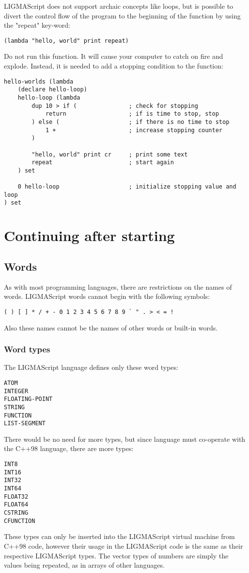 \documentclass[12pt]{article}
\begin{document}
LIGMAScript does not support archaic concepts like loops, but is possible to divert the control flow of 
the program to the beginning of the function by using the "repeat" key-word:
\begin{verbatim}(lambda "hello, world" print repeat)\end{verbatim}
Do not run this function. It will cause your computer to catch on fire and explode. Instead, it is needed to add a stopping condition 
to the function:
\pagebreak
\begin{Verbatim}
hello-worlds (lambda 
    (declare hello-loop)
    hello-loop (lambda
        dup 10 > if (               ; check for stopping
            return                  ; if is time to stop, stop
        ) else (                    ; if there is no time to stop
            1 +                     ; increase stopping counter
        )

        "hello, world" print cr     ; print some text
        repeat                      ; start again
    ) set

    0 hello-loop                    ; initialize stopping value and loop
) set
\end{Verbatim}

\section{Continuing after starting}

\subsection{Words}

As with most programming languages, there are restrictions on the names of words. LIGMA\-Script words cannot begin 
with the following symbols:
\begin{verbatim}( ) [ ] * / + - 0 1 2 3 4 5 6 7 8 9 ` " . > < = ! \end{verbatim}
Also these names cannot be the names of other words or built-in words.

\subsubsection{Word types}

The LIGMAScript language defines only these word types:
\begin{verbatim}
ATOM
INTEGER
FLOATING-POINT
STRING
FUNCTION
LIST-SEGMENT
\end{verbatim}
There would be no need for more types, but since language must co-operate with the C++98 language, there 
are more types:
\begin{verbatim}
INT8
INT16
INT32
INT64
FLOAT32
FLOAT64
CSTRING
CFUNCTION
\end{verbatim}
These types can only be inserted into the LIGMAScript virtual machine from C++98 code, however their usage 
in the LIGMAScript code is the same as their respective LIGMAScript types.
The vector types of numbers are simply the values being repeated, as in arrays of other languages.
\end{document}
